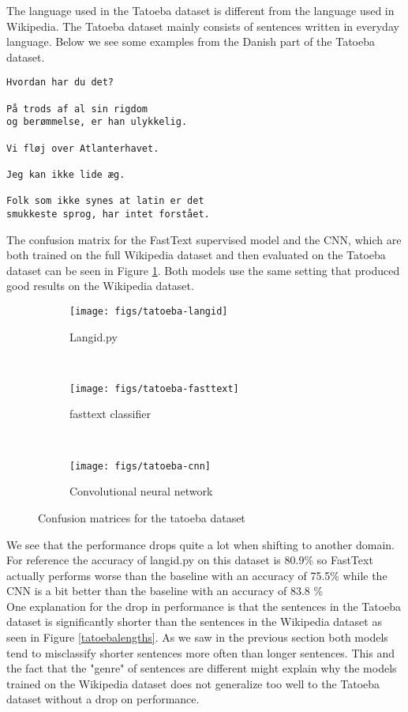 The language used in the Tatoeba dataset is different from the language used in Wikipedia. The Tatoeba dataset mainly consists of sentences written in everyday language. Below we see some examples from the Danish part of the Tatoeba dataset.
\begin{verbatim}
Hvordan har du det?

På trods af al sin rigdom
og berømmelse, er han ulykkelig.

Vi fløj over Atlanterhavet.

Jeg kan ikke lide æg.

Folk som ikke synes at latin er det
smukkeste sprog, har intet forstået.
\end{verbatim}

The confusion matrix for the FastText supervised model and the CNN, which are both trained on the full Wikipedia dataset and then evaluated on the Tatoeba dataset can be seen in Figure \ref{tatoeba-confuss}. Both models use the same setting that produced good results on the Wikipedia dataset.

\begin{figure}[h!]
    \centering
    \begin{subfigure}[b]{0.45\textwidth}
        \texttt{[image: figs/tatoeba-langid]}
        \caption{Langid.py}
    \end{subfigure}
    ~
    \begin{subfigure}[b]{0.45\textwidth}
        \texttt{[image: figs/tatoeba-fasttext]}
        \caption{fasttext classifier }
    \end{subfigure}
    ~
    \begin{subfigure}[b]{0.45\textwidth}
        \texttt{[image: figs/tatoeba-cnn]}
        \caption{Convolutional neural network}
    \end{subfigure}
    \caption{Confusion matrices for the tatoeba dataset }
    \label{tatoeba-confuss}
\end{figure}

We see that the performance drops quite a lot when shifting to another domain. For reference the accuracy of langid.py on this dataset is 80.9\% so FastText actually performs worse than the baseline with an accuracy of 75.5\% while the CNN is a bit better than the baseline with an accuracy of 83.8 \% \\

One explanation for the drop in performance is that the sentences in the Tatoeba dataset is significantly shorter than the sentences in the Wikipedia dataset as seen in Figure \ref{tatoebalengths}. As we saw in the previous section both models tend to misclassify shorter sentences more often than longer sentences. This and the fact that the "genre" of sentences are different might explain why the models trained on the Wikipedia dataset does not generalize too well to the Tatoeba dataset without a drop on performance.\\

